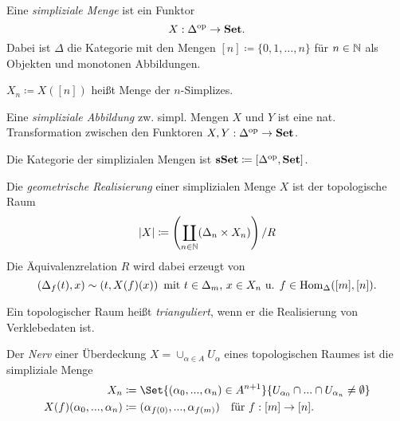 \documentclass{cheat-sheet}
\begin{document}


\begin{defn}
  Eine \emph{simpliziale Menge} ist ein Funktor
  \[ X : \Delta^{\mathrm{op}} \to \mathbf{Set}. \]
  Dabei ist $\Delta$ die Kategorie mit den Mengen
  $[n] \coloneqq \{ 0, 1, \ldots, n \}$ für $n \in \mathbb{N}$ als Objekten und monotonen Abbildungen.
\end{defn}

\begin{nota}
  $X_n \coloneqq X([n])$ heißt Menge der $n$-Simplizes.
\end{nota}

\begin{defn}
  Eine \emph{simpliziale Abbildung} zw. simpl. Mengen $X$ und $Y$ ist eine nat. Transformation zwischen den Funktoren $X, Y : \Delta^{\mathrm{op}} \to \mathbf{Set}$.
\end{defn}

\begin{defn}
  Die Kategorie der simplizialen Mengen ist $\mathbf{sSet} \coloneqq [\Delta^{\mathrm{op}}, \mathbf{Set}]$.
\end{defn}

\begin{defn}
  Die \emph{geometrische Realisierung} einer simplizialen Menge $X$ ist der topologische Raum
  \[ \lvert X\rvert \coloneqq \left( \coprod_{n \in \mathbb{N}} (\Delta_n \times X_{n}) \right) / R \]
  Die Äquivalenzrelation $R$ wird dabei erzeugt von
  \[
    (\Delta_f(t), x) \sim (t, X(f)(x)) \enspace
    \text{mit $t \in \Delta_m$, $x \in X_n$ u. $f \in \operatorname{Hom}_\Delta([m], [n])$.}
  \]
\end{defn}

\begin{defn}
  Ein topologischer Raum heißt \emph{trianguliert}, wenn er die Realisierung von Verklebedaten ist.
\end{defn}

\begin{defn}
  Der \emph{Nerv} einer Überdeckung $X = \cup_{\alpha \in A} U_\alpha$ eines topologischen Raumes ist die simpliziale Menge
  \begin{align*}
    X_n & \coloneqq \Set{(\alpha_0, \nldots, \alpha_n) \in A^{n+1}}{ U_{\alpha_0} \cap \nldots \cap U_{\alpha_n} \not= \emptyset } \\
    X(f)(\alpha_0, \nldots, \alpha_n) & \coloneqq (\alpha_{f(0)}, \nldots, \alpha_{f(m)}) \quad \text{für } f : [m] \to [n].
  \end{align*}
\end{defn}
\end{document}
